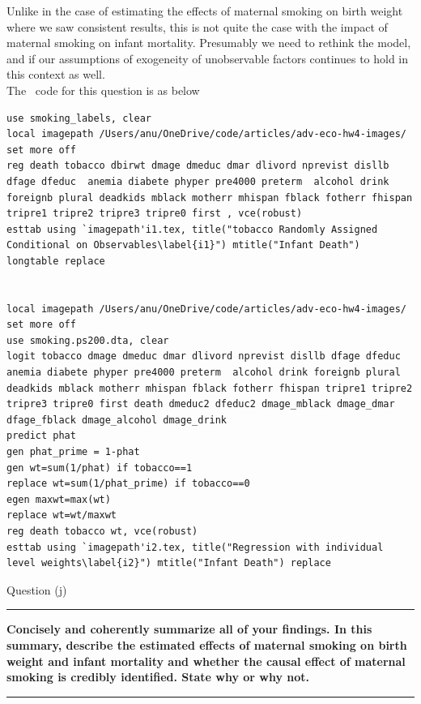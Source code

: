\documentclass[12pt]{article}
\newcommand\question[1]{\vspace{1em}\hrule\vspace{1em}\textbf{#1}\vspace{1em}\hrule\vspace{1em}}
\begin{document}
Unlike in the case of estimating the effects of maternal smoking on birth weight where we saw consistent results, this is not quite the case with the impact of maternal smoking on infant mortality. Presumably we need to rethink the model, and if our assumptions of exogeneity of unobservable factors continues to hold in this context as well.\\
The \stata \ code   for this question is as below
\begin{lstlisting}
use smoking_labels, clear
local imagepath /Users/anu/OneDrive/code/articles/adv-eco-hw4-images/
set more off
reg death tobacco dbirwt dmage dmeduc dmar dlivord nprevist disllb dfage dfeduc  anemia diabete phyper pre4000 preterm  alcohol drink foreignb plural deadkids mblack motherr mhispan fblack fotherr fhispan tripre1 tripre2 tripre3 tripre0 first , vce(robust)
esttab using `imagepath'i1.tex, title("tobacco Randomly Assigned Conditional on Observables\label{i1}") mtitle("Infant Death") longtable replace


local imagepath /Users/anu/OneDrive/code/articles/adv-eco-hw4-images/
set more off
use smoking.ps200.dta, clear
logit tobacco dmage dmeduc dmar dlivord nprevist disllb dfage dfeduc  anemia diabete phyper pre4000 preterm  alcohol drink foreignb plural deadkids mblack motherr mhispan fblack fotherr fhispan tripre1 tripre2 tripre3 tripre0 first death dmeduc2 dfeduc2 dmage_mblack dmage_dmar dfage_fblack dmage_alcohol dmage_drink
predict phat
gen phat_prime = 1-phat
gen wt=sum(1/phat) if tobacco==1
replace wt=sum(1/phat_prime) if tobacco==0
egen maxwt=max(wt)
replace wt=wt/maxwt
reg death tobacco wt, vce(robust)
esttab using `imagepath'i2.tex, title("Regression with individual level weights\label{i2}") mtitle("Infant Death") replace
\end{lstlisting}
\newpage
\begin{center}\LARGE{Question (j)}\end{center}
\question{Concisely and coherently summarize all of your findings.  In this summary, describe the estimated effects of maternal smoking on birth weight and infant mortality and whether the causal effect of maternal smoking is credibly identified.  State why or why not.}
\end{document}
